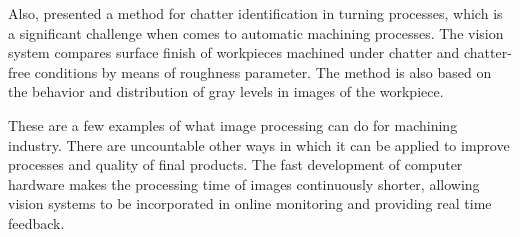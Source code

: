 Also,  presented a method for chatter identification in turning processes, which is a significant challenge when comes to automatic machining processes. The vision system compares surface finish of workpieces machined under chatter and chatter-free conditions by means of roughness parameter. The method is also based on the behavior and distribution of gray levels in images of the workpiece.

 These are a few examples of what image processing can do for machining industry. There are uncountable other ways in which it can be applied to improve processes and quality of final products. The fast development of computer hardware makes the processing time of images continuously shorter, allowing vision systems to be incorporated in online monitoring and providing real time feedback.
